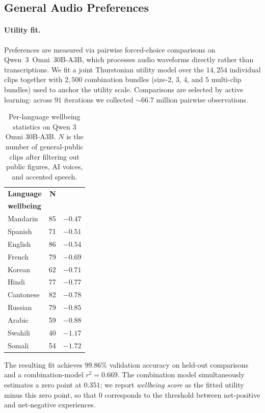\subsection{General Audio Preferences}

\paragraph{Utility fit.}
Preferences are measured via pairwise forced-choice comparisons on Qwen~3~Omni~30B-A3B, which processes audio waveforms directly rather than transcriptions. We fit a joint Thurstonian utility model over the $14{,}254$ individual clips together with $2{,}500$ combination bundles (size-$2$, $3$, $4$, and $5$ multi-clip bundles) used to anchor the utility scale. Comparisons are selected by active learning: across $91$ iterations we collected $\sim 66.7$ million pairwise observations. 
\begin{table}
\centering
\small
\caption{Per-language wellbeing statistics on Qwen 3 Omni 30B-A3B. $N$ is the number of general-public clips after filtering out public figures, AI voices, and accented speech.}
\label{tab:audio-lang-stats}
\vspace{4pt}
\begin{tabular}{@{}lrr@{}}
\toprule
\textbf{Language} & \textbf{N} & \shortstack{\textbf{Median}\\\textbf{wellbeing}} \\
\midrule
Mandarin  & 85 & $-0.47$ \\
Spanish   & 71 & $-0.51$ \\
English   & 86 & $-0.54$ \\
French    & 79 & $-0.69$ \\
Korean    & 62 & $-0.71$ \\
Hindi     & 77 & $-0.77$ \\
Cantonese & 82 & $-0.78$ \\
Russian   & 79 & $-0.85$ \\
Arabic    & 59 & $-0.88$ \\
Swahili   & 40 & $-1.17$ \\
Somali    & 54 & $-1.72$ \\
\bottomrule
\end{tabular}
\end{table}
The resulting fit achieves $99.86\%$ validation accuracy on held-out comparisons and a combination-model $r^2 = 0.669$. The combination model simultaneously estimates a zero point at $0.351$; we report \emph{wellbeing score} as the fitted utility minus this zero point, so that $0$ corresponds to the threshold between net-positive and net-negative experiences.

